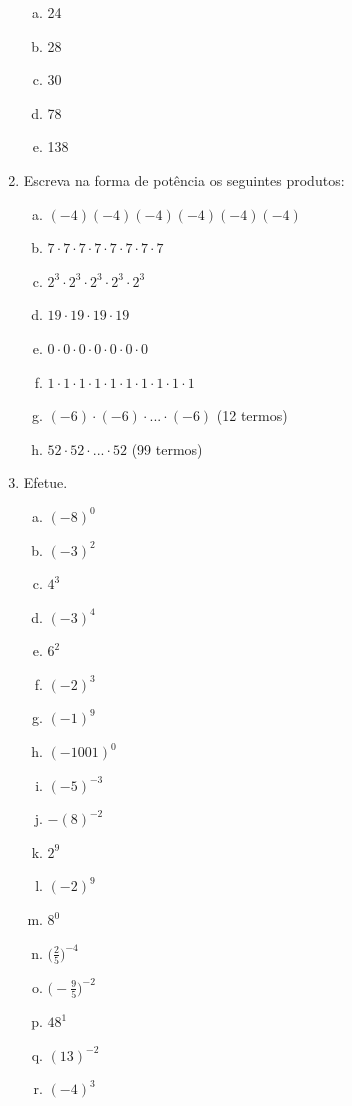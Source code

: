\documentclass[a4paper,14pt]{article}
\begin{document}
\begin{multicols}{2}
\begin{enumerate}
			\begin{enumerate}[a)]
				\item 24
				\item 28
				\item 30
				\item 78
				\item 138
			\end{enumerate}
			\item Escreva na forma de potência os seguintes produtos:
			\begin{enumerate}[a)]
				\item $(-4)(-4)(-4)(-4)(-4)(-4)$
				\item $7 \cdot 7 \cdot 7 \cdot 7 \cdot 7 \cdot 7 \cdot 7 \cdot 7$
				\item $2^3 \cdot 2^3 \cdot 2^3 \cdot 2^3 \cdot 2^3$
				\item $19 \cdot 19 \cdot 19 \cdot 19$
				\item $0 \cdot 0 \cdot 0 \cdot 0 \cdot 0 \cdot 0 \cdot 0$
				\item $1 \cdot 1 \cdot 1 \cdot 1 \cdot 1 \cdot 1 \cdot 1 \cdot 1 \cdot 1 \cdot 1$
				\item $(-6) \cdot (-6) \cdot ... \cdot (-6)$  (12 termos)
				\item $52 \cdot 52 \cdot ... \cdot 52$ (99 termos)
			\end{enumerate}
			\item Efetue.
			\begin{enumerate}[a)]
				\item $(-8)^0$
				\item $(-3)^2$
				\item $4^3$
				\item $(-3)^4$
				\item $6^2$
				\item $(-2)^3$
				\item $(-1)^9$
				\item $(-1 001)^0$
				\item $(-5)^{-3}$
				\item $-(8)^{-2}$
				\item $2^9$
				\item $(-2)^9$
				\item $8^0$
				\item $\bigg(\frac{2}{5}\bigg)^{-4}$
				\item $\bigg(-\frac{9}{5}\bigg)^{-2}$
				\item $48^1$
				\item $(13)^{-2}$
				\item $(-4)^3$

\end{enumerate}
\end{enumerate}
\end{multicols}
\end{document}
